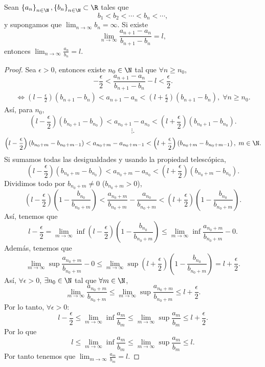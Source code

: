 \begin{ftheorem}
	\normalfont Sean $\displaystyle \left\{ a_{n}\right\} _{n\in\N}, \left\{ b_{n}\right\} _{n\in\N}\subset \R $ tales que 
	\[b_{1} < b_{2} < \cdots < b_{n} < \cdots  ,\]
	y supongamos que $\displaystyle \lim_{n \to \infty}b_{n}= \infty $. Si existe 
	\[\lim_{n \to \infty}\frac{a_{n+1}-a_{n}}{b_{n+1}-b_{n}} = l , \]
	entonces $\displaystyle \lim_{n \to \infty}\frac{a_{n}}{b_{n}} = l $.
\end{ftheorem}

\begin{proof}
Sea $\displaystyle \epsilon > 0 $, entonces existe $\displaystyle n_{0} \in \N $ tal que $\displaystyle \forall n \geq n_{0} $, 
\[ -\frac{\epsilon }{2} < \frac{a_{n+1}-a_{n}}{b_{n+1}-b_{n}} - l < \frac{\epsilon }{2} .\]
\[
\begin{split}
 \iff\left(l  - \frac{\epsilon }{2}\right)\left(b_{n+1}-b_{n}\right) < a_{n+1}-a_{n} < \left(l + \frac{\epsilon }{2}\right)\left(b_{n+1}-b_{n}\right), \; \forall n\geq n_{0}.
\end{split}
\]
Así, para $\displaystyle n_{0} $,
\[\left(l  - \frac{\epsilon }{2}\right)\left(b_{n_{0}+1}-b_{n_{0}}\right) < a_{n_{0}+1}-a_{n_{0}} < \left(l + \frac{\epsilon }{2}\right)\left(b_{n_{0}+1}-b_{n_{0}}\right) .\]
\[\vdots .\]
\[\left(l-\frac{\epsilon }{2}\right)\left(b_{n_{0}+m}-b_{n_{0}+m -1}\right) < a_{n_{0}+m} - a_{n_{0}+m -1}<\left(l+\frac{\epsilon }{2}\right)\left(b_{n_{0}+m}-b_{n_{0}+m -1}\right), \; m \in \N .\]
Si sumamos todas las desigualdades y usando la propiedad telescópica, 
\[\left(l - \frac{\epsilon }{2}\right)\left(b_{n_{0}+m}-b_{n_{0}}\right) < a_{n_{0}+m} - a_{n_{0}}< \left(l + \frac{\epsilon }{2}\right)\left(b_{n_{0}+m}-b_{n_{0}}\right) .\]
Dividimos todo por $\displaystyle b_{n_{0}+m} \neq 0 $ ($\displaystyle b_{n_{0}+m} > 0 $), 
\[ \left(l-\frac{\epsilon }{2}\right)\left(1-\frac{b_{n_{0}}}{b_{n_{0}+m}}\right) < \frac{a_{n_{0}+m}}{b_{n_{0}+m}}-\frac{a_{n_{0}}}{b_{n_{0}+m}}<\left(l+\frac{\epsilon }{2}\right)\left(1 - \frac{b_{n_{0}}}{b_{n_{0}+m}}\right).\]
Así, tenemos que 
\[l - \frac{\epsilon }{2} = \lim_{m \to \infty}\inf\left(l-\frac{\epsilon }{2}\right)\left(1 - \frac{b_{n_{0}}}{b_{n_{0}+m}}\right) \leq \lim_{m \to \infty}\inf \frac{a_{n_{0}+m}}{b_{n_{0}+m}} - 0.\]
Además, tenemos que 
\[\lim_{m \to \infty}\sup \frac{a_{n_{0}+m}}{b_{n_{0}+m}} - 0 \leq \lim_{m \to \infty}\sup\left(l+\frac{\epsilon }{2}\right)\left(1-\frac{b_{n_{0}}}{b_{n_{0}+m}}\right) = l + \frac{\epsilon }{2} .\]
Así, $\displaystyle \forall \epsilon > 0 $, $\displaystyle \exists n_{0} \in \N $ tal que $\displaystyle \forall m \in \N $, 
\[\lim_{m \to \infty}\frac{a_{n_{0}+m}}{b_{n_{0}+m}} \leq \lim_{m \to \infty}\sup\frac{a_{n_{0}+m}}{b_{n_{0}+m}} \leq l + \frac{\epsilon }{2} .\]
Por lo tanto, $\displaystyle \forall \epsilon > 0 $:
\[l - \frac{\epsilon }{2} \leq \lim_{m \to \infty}\inf \frac{a_{m}}{b_{m}} \leq \lim_{m \to \infty}\sup \frac{a_{m}}{b_{m}} \leq l + \frac{\epsilon }{2}.\]
Por lo que
\[l \leq \lim_{m \to \infty}\inf \frac{a_{m}}{b_{m}} \leq \lim_{m \to \infty}\sup \frac{a_{m}}{b_{m}} \leq l .\]
Por tanto tenemos que $\displaystyle \lim_{m \to \infty}\frac{a_{m}}{b_{m}} = l $.
\end{proof}

